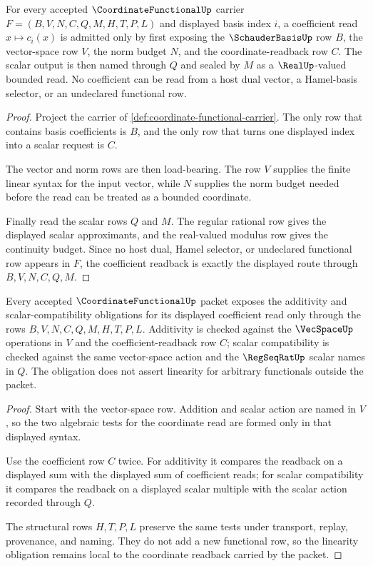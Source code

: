 \begin{theorem}
\label{thm:coordinate-functional-coefficient-readback}
For every accepted $\CoordinateFunctionalUp$ carrier $F=(B,V,N,C,Q,M,H,T,P,L)$ and displayed basis index $i$, a coefficient read $x\mapsto c_i(x)$ is admitted only by first exposing the $\SchauderBasisUp$ row $B$, the vector-space row $V$, the norm budget $N$, and the coordinate-readback row $C$. The scalar output is then named through $Q$ and sealed by $M$ as a $\RealUp$-valued bounded read. No coefficient can be read from a host dual vector, a Hamel-basis selector, or an undeclared functional row.
\end{theorem}
\begin{proof}
Project the carrier of \autoref{def:coordinate-functional-carrier}. The only row that contains basis coefficients is $B$, and the only row that turns one displayed index into a scalar request is $C$.

The vector and norm rows are then load-bearing. The row $V$ supplies the finite linear syntax for the input vector, while $N$ supplies the norm budget needed before the read can be treated as a bounded coordinate.

Finally read the scalar rows $Q$ and $M$. The regular rational row gives the displayed scalar approximants, and the real-valued modulus row gives the continuity budget. Since no host dual, Hamel selector, or undeclared functional row appears in $F$, the coefficient readback is exactly the displayed route through $B,V,N,C,Q,M$.
\end{proof}

\begin{theorem}
\label{thm:coordinate-functional-linearity-obligation}
Every accepted $\CoordinateFunctionalUp$ packet exposes the additivity and scalar-compatibility obligations for its displayed coefficient read only through the rows $B,V,N,C,Q,M,H,T,P,L$. Additivity is checked against the $\VecSpaceUp$ operations in $V$ and the coefficient-readback row $C$; scalar compatibility is checked against the same vector-space action and the $\RegSeqRatUp$ scalar names in $Q$. The obligation does not assert linearity for arbitrary functionals outside the packet.
\end{theorem}
\begin{proof}
Start with the vector-space row. Addition and scalar action are named in $V$, so the two algebraic tests for the coordinate read are formed only in that displayed syntax.

Use the coefficient row $C$ twice. For additivity it compares the readback on a displayed sum with the displayed sum of coefficient reads; for scalar compatibility it compares the readback on a displayed scalar multiple with the scalar action recorded through $Q$.

The structural rows $H,T,P,L$ preserve the same tests under transport, replay, provenance, and naming. They do not add a new functional row, so the linearity obligation remains local to the coordinate readback carried by the packet.
\end{proof}


